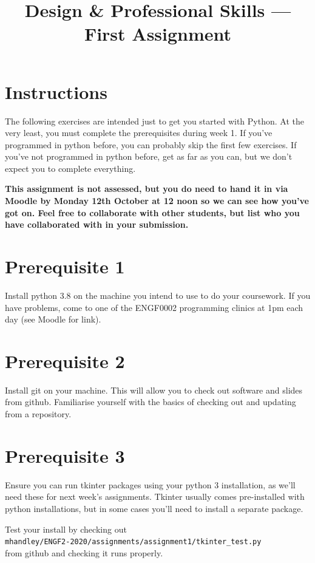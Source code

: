 \documentclass{article}
\title{Design \& Professional Skills --- First Assignment}
\author{}
\date{}
\begin{document}
\maketitle

\section*{Instructions}

The following exercises are intended just to get you started with
Python.  At the very least, you must complete the prerequisites during
week 1.  If you've programmed in python before, you can probably skip
the first few exercises.  If you've not programmed in python before,
get as far as you can, but we don't expect you to complete everything.

\textbf{This assignment is not assessed, but you do need to hand it in
  via Moodle by Monday 12th October at 12 noon so we can see how you've
  got on.  Feel free to collaborate with other students, but list who
  you have collaborated with in your submission.}

\section*{Prerequisite 1}

Install python 3.8 on the machine you intend to use to do your
coursework.  If you have problems, come to one of the ENGF0002
programming clinics at 1pm each day (see Moodle for link).

\section*{Prerequisite 2}

Install git on your machine.  This will allow you to check out
software and slides from github.  Familiarise yourself with the basics
of checking out and updating from a repository.

\section*{Prerequisite 3}

Ensure you can run tkinter packages using your python 3 installation,
as we'll need these for next week's assignments.  Tkinter usually
comes pre-installed with python installations, but in some cases you'll need to
install a separate package.

\vspace{0.1in}\noindent Test your install by checking out\\
\texttt{mhandley/ENGF2-2020/assignments/assignment1/tkinter\_test.py}\\
from github and checking it runs properly.
\end{document}
